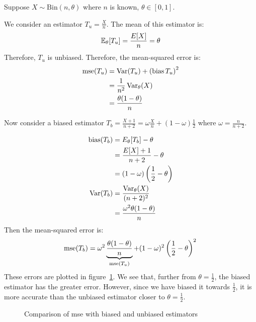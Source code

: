 \documentclass[../Main.tex]{subfiles}
\begin{document}
\begin{example}
    Suppose $X \sim \text{Bin}(n, \theta)$ where $n$ is known, $\theta \in [0, 1]$.

    We consider an estimator $T_u = \frac{X}{n}$. The mean of this estimator is:
    \begin{equation*}
        \mathbb{E}_\theta[T_u] = \frac{E[X]}{n} = \theta
    \end{equation*}
    Therefore, $T_u$ is unbiased. Therefore, the mean-squared error is:
    \begin{align*}
        \operatorname{mse}(T_u) &= \operatorname{Var}(T_u) + \left(\operatorname{bias}{T_u}\right)^2 \\
        &= \frac{1}{n^2} \operatorname{Var}_\theta(X) \\
        &= \frac{\theta(1-\theta)}{n}
    \end{align*}
    
    Now consider a biased estimator $T_b = \frac{X + 1}{n + 2} = \omega \frac{X}{n} + (1 - \omega) \frac12$ where $\omega = \frac{n}{n+2}$.

    \begin{align*}
        \operatorname{bias}(T_b) &= E_\theta[T_b] - \theta \\
        &= \frac{E[X] + 1}{n + 2} - \theta \\
        &= (1 - \omega)\left(\frac12 - \theta\right) \\
        \operatorname{Var}(T_b) &= \frac{\operatorname{Var}_\theta(X)}{(n + 2)^2} \\
        &= \frac{\omega^2 \theta(1-\theta)}{n}
    \end{align*}
    Then the mean-squared error is:
    \begin{equation*}
        \operatorname{mse}(T_b) = \omega^2\underbrace{\frac{\theta(1-\theta)}{n}}_{\operatorname{mse}(T_u)} + (1 - \omega)^2 \left(\frac12 - \theta\right)^2 \\
    \end{equation*}
    These errors are plotted in figure~\ref{figEstimatorErrorPlot}. We see that, further from $\theta = \frac12$, the biased estimator has the greater error. However, since we have biased it towards $\frac12$, it is more accurate than the unbiased estimator closer to $\theta = \frac12$.
\end{example}
\begin{figure}
    \centering
    \caption{Comparison of mse with biased and unbiased estimators}
    \label{figEstimatorErrorPlot}
\end{figure}
\end{document}
